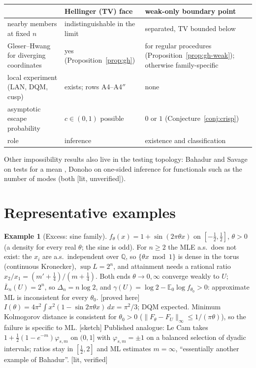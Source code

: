 \documentclass[11pt]{article}
\newcommand{\E}{\mathbb E}
\newcommand{\bL}{\overline L}
\newcommand{\status}[1]{\textsf{[#1]}}
\theoremstyle{definition}
\newtheorem{example}[theorem]{Example}
\theoremstyle{remark}
\begin{document}
\begin{center}\small
\begin{tabular}{@{}p{4.2cm}p{4.9cm}p{4.9cm}@{}}
\toprule
 & Hellinger (TV) face & weak-only boundary point\\
\midrule
nearby members at fixed $n$ & indistinguishable in the limit & separated, TV bounded below\\
Gleser--Hwang for diverging coordinates & yes (Proposition~\ref{prop:gh}) & for regular procedures (Proposition~\ref{prop:gh-weak}); otherwise family-specific\\
local experiment (LAN, DQM, cusp) & exists; rows A4--A4$''$ & none\\
asymptotic escape probability & $c\in(0,1)$ possible & $0$ or $1$ (Conjecture~\ref{conj:crisp})\\
role & inference & existence and classification\\
\bottomrule
\end{tabular}
\end{center}
Other impossibility results also live in the testing topology: Bahadur and
Savage on tests for a mean \cite{bahadursavage}, Donoho on one-sided
inference for functionals such as the number of modes \cite{donoho88}
(both \status{lit, unverified}).

\section{Representative examples}

\begin{example}[Excess: sine family]\label{ex:sine}
$f_\theta(x)=1+\sin(2\pi\theta x)$ on $[-\frac12,\frac12]$, $\theta>0$ (a
density for every real $\theta$; the sine is odd).
For $n\ge2$ the MLE a.s.\ does not exist: the $x_i$ are a.s.\ independent
over $\mathbb Q$, so $\{\theta x\bmod1\}$ is dense in the torus (continuous
Kronecker), $\sup L=2^n$, and attainment needs a rational ratio
$x_2/x_1=(m'+\frac14)/(m+\frac14)$. Both ends $\theta\to0,\infty$ converge
weakly to $U$; $\bL_n(U)=2^n$, so $\Delta_n=n\log2$, and
$\gamma(U)=\log2-\E_0\log f_{\theta_0}>0$: approximate ML is inconsistent
for every $\theta_0$. \status{proved here}
$I(\theta)=4\pi^2\int x^2(1-\sin2\pi\theta x)\,dx=\pi^2/3$; DQM expected.
Minimum Kolmogorov distance is consistent for $\theta_0>0$
($\|F_\theta-F_U\|_\infty\le1/(\pi\theta)$), so the failure is specific to ML.
\status{sketch}
Published analogue: Le Cam \cite[\S4]{lecam} takes
$1+\frac12(1-e^{-m})\varphi_{s,m}$ on $(0,1]$ with $\varphi_{s,m}=\pm1$ on a
balanced selection of dyadic intervals; ratios stay in $[\frac12,2]$ and ML
estimates $m=\infty$, ``essentially another example of Bahadur''.
\status{lit, verified}
\end{example}
\end{document}
